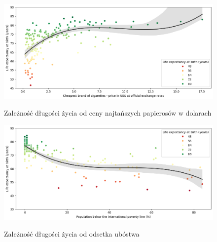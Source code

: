 \documentclass{article}
\begin{document}
\begin{enumerate}
    \begin{figure}[H]
        \begin{minipage}[t]{0.48\textwidth}
            \label{fig:cigarettes}
            \includegraphics[width=\textwidth]{graphs/cigarettes.png}
            \caption{Zależność długości życia od ceny najtańszych papierosów w dolarach}
            \centering
        \end{minipage}
        \hfill
        \begin{minipage}[t]{0.48\textwidth}
            \label{fig:poverty}
            \includegraphics[width=\textwidth]{graphs/poverty.png}
            \caption{Zależność długości życia od odsetka ubóstwa}
            \centering
        \end{minipage}
    \end{figure}


\end{enumerate}
\end{document}
